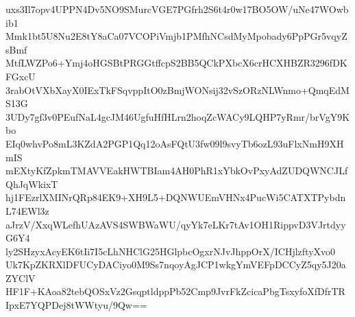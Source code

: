 uxs3Il7opv4UPPN4Dv5NO9SMurcVGE7PGfrh2S6t4r0w17BO5OW/uNe47WOwbib1
Mmk1bt5U8Nu2E8tY8aCa07VCOPiVmjb1PMfhNCsdMyMpobady6PpPGr5vqyZsBmf
MtfLWZPo6+Ymj4oHGSBtPRGGtffcpS2BB5QCkPXbcX6crHCXHBZR3296fDKFGxcU
3rabOtVXbXayX0IExTkFSqvppItO0zBmjWONsij32vSzORzNLWnmo+QmqEdMS13G
3UDy7gf3v0PEufNaL4gcJM46UgfuHfHLrn2hoqZcWACy9LQHP7yRmr/brVgY9Kbo
EIq0whvPo8mL3KZdA2PGP1Qq12oAsFQtU3fw09l9svyTb6ozL93uFlxNmH9XHmIS
mEXtyKfZpkmTMAVVEakHWTBIam4AH0PhR1xYbkOvPxyAdZUDQWNCJLfQhJqWkixT
hj1FEzrlXMINrQRp84EK9+XH9L5+DQNWUEmVHNx4PucWi5CATXTPybdnL74EWl3z
aJrzV/XxqWLefhUAzAVS4SWBWaWU/qyYk7eLKr7tAv1OH1RippvD3VJrtdyyG6Y4
ly2SHzyxAcyEK6tIi7I5cLhNHClG25HGlpbcOgxrNJvJhppOrX/ICHjlzftyXvo0
Uk7KpZKRXlDFUCyDACiyo0M9Ss7nqoyAgJCP1wkgYmVEFpDCCyZ5qy5J20aZYClV
HF1F+KAoa82tebQOSxVz2GsqptldppPb52Cmp9JvrFkZcicaPbgTsxyfoXfDfrTR
IpxE7YQPDej8tWWtyu/9Qw==
